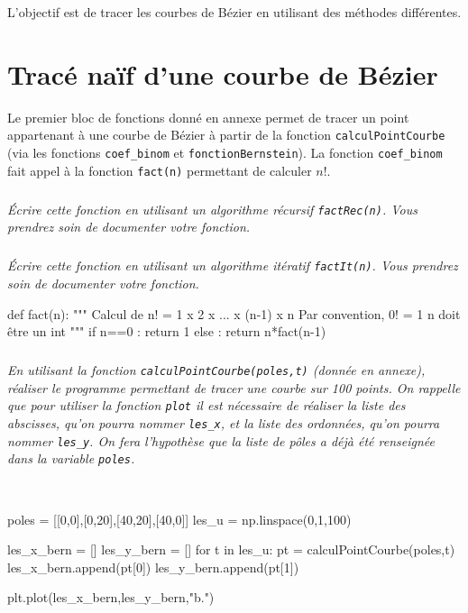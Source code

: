 \documentclass[10pt,fleqn]{article} %
\begin{document}
\begin{obj}
L'objectif est de tracer les courbes de Bézier en utilisant des méthodes différentes.
\end{obj}
\fi

\section{Tracé naïf d'une courbe de Bézier}
\ifprof
\else
Le premier bloc de fonctions donné en annexe permet de tracer un point appartenant à une courbe de Bézier à partir de la fonction \texttt{calculPointCourbe} (via les fonctions \texttt{coef\_binom} et \texttt{fonctionBernstein}). La fonction  \texttt{coef\_binom} fait appel à la fonction \texttt{fact(n)} permettant de calculer $n!$. 
\fi

\subparagraph{}
\textit{Écrire cette fonction en utilisant un algorithme récursif \texttt{factRec(n)}. Vous prendrez soin de documenter votre fonction.}
\ifprof
\begin{corrige}
\end{corrige}
\else
\fi
\subparagraph{}
\textit{Écrire cette fonction en utilisant un algorithme itératif \texttt{factIt(n)}. Vous prendrez soin de documenter votre fonction.}
\ifprof
\begin{corrige}
\begin{py}
\begin{python}
def fact(n):
    """
    Calcul de n! = 1 x 2 x ... x (n-1) x n
    Par convention, 0! = 1
    n doit être un int
    """
    if n==0 :
        return 1
    else : 
        return n*fact(n-1)
\end{python}
\end{py}
\end{corrige}
\else
\fi

\subparagraph{}
\textit{En utilisant la fonction \texttt{calculPointCourbe(poles,t)} (donnée en annexe), réaliser le programme permettant de tracer une courbe sur 100 points. 
On rappelle que pour utiliser la fonction \texttt{plot} il est nécessaire de réaliser la liste des abscisses, qu'on pourra nommer \texttt{les\_x}, et la liste des ordonnées, qu'on pourra nommer \texttt{les\_y}. On fera l'hypothèse que la liste de pôles a déjà été renseignée dans la variable \texttt{poles}. }
\ifprof
\begin{corrige}~\\

\begin{py}
\begin{python}
poles = [[0,0],[0,20],[40,20],[40,0]]
les_u = np.linspace(0,1,100)

les_x_bern = []
les_y_bern = []
for t in les_u:
    pt = calculPointCourbe(poles,t)
    les_x_bern.append(pt[0])
    les_y_bern.append(pt[1])

plt.plot(les_x_bern,les_y_bern,"b.")
\end{python}
\end{py}    
\end{corrige}
\else
\fi
\end{document}
